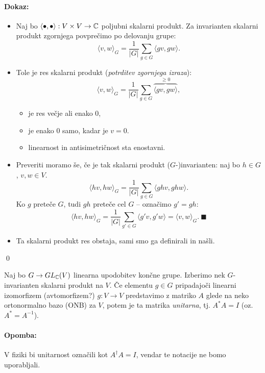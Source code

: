 \paragraph{Dokaz:}
\begin{itemize}
	\item{Naj bo $\langle \bullet, \bullet \rangle : V \times V \to \mathbb{C}$ poljubni skalarni produkt. Za invarianten skalarni produkt zgornjega
		povpre\v cimo po delovanju grupe:
		\[
			\langle v, w \rangle_G = \frac{1}{|G|}\sum_{g \in G} \langle gv, gw \rangle.
		\]}
	\item{Tole je res skalarni produkt ({\em potrditev zgornjega izraza}):
		\[
			\langle v, w \rangle_G = \frac{1}{|G|}\sum_{g \in G} \overbrace{\langle gv, gw \rangle}^{\geq 0},
		\]
		\begin{itemize}
			\item{je res ve\v cje ali enako $0$,}
			\item{je enako $0$ samo, kadar je $v = 0$.}
			\item{linearnost in antisimetri\v cnost sta enostavni.}
		\end{itemize}}
	\item{Preveriti moramo \v se, \v ce je tak skalarni produkt ($G$-)invarianten: naj bo $h \in G$, $v,w \in V$.
		\[
			\langle hv, hw\rangle_G = \frac{1}{|G|}\sum_{g \in G} \langle ghv, ghw \rangle.
		\]
		Ko $g$ prete\v ce $G$, tudi $gh$ prete\v ce cel $G$ -- ozna\v cimo $g' = gh$:
		\[
			\langle hv, hw\rangle_G = \frac{1}{|G|}\sum_{g' \in G} \langle g'v, g'w\rangle = \langle v, w \rangle_G.\ \blacksquare
		\]}
	\item{Ta skalarni produkt res obstaja, sami smo ga definirali in na\v sli.}
\end{itemize}
\qed

\begin{posledica}
	Naj bo $G \to GL_{\mathbb{C}}(V)$ linearna upodobitev kon\v cne grupe. Izberimo nek $G$-invarianten skalarni produkt na $V$.
	\v Ce elementu $g \in G$ pripadajo\v ci linearni izomorfizem (avtomorfizem?) $g:V \to V$ predstavimo z matriko $A$
	glede na neko ortonormalno bazo (ONB) za $V$, potem je ta matrika {\em unitarna}, tj. $A^* A = I$ (oz. $A^* = A^{-1}$).
	\paragraph{Opomba:} V fiziki bi unitarnost ozna\v cili kot $A^\dagger A = I$, vendar te notacije ne bomo uporabljali.
\end{posledica}

